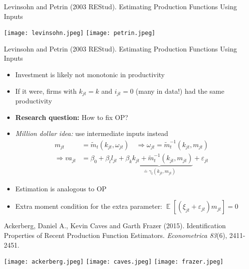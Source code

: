 \documentclass[aspectratio=169,compress,t,xcolor=table]{beamer}
\DeclareMathOperator{\E}{\mathbb{E}}                       %
\begin{document}
\begin{frame}{}
Levinsohn and Petrin (2003 REStud). Estimating Production Functions Using Inputs \\ \phantom{you}
  \begin{center}
    \texttt{[image: levinsohn.jpeg]} \hspace*{1em}
    \texttt{[image: petrin.jpeg]}
  \end{center}
\end{frame}
\addtocounter{framenumber}{-1}

\begin{frame}{}
Levinsohn and Petrin (2003 REStud). Estimating Production Functions Using Inputs
  \begin{itemize}
    \vfill\item Investment is likely not monotonic in productivity
    \vfill\item If it were, firms with \(k_{jt}=k\) and \(i_{jt}=0\) (many in data!) had the same productivity
    \vfill\item {\color{MyStructure}\textbf{Research question:}} How to fix OP?
    \vfill\item {\color{MyStructure}\textit{Million dollar idea:}} use intermediate inputs instead
    \begin{align*}
      m_{jt} &= \tilde{m}_t (k_{jt}, \omega_{jt}) \quad \Rightarrow \omega_{jt} = \tilde{m}^{-1}_t(k_{jt}, m_{jt}) \\[0.5em]
      \Rightarrow va_{jt} &= \beta_0 + \beta_l l_{jt} + \underbrace{\beta_k k_{jt} + \tilde{m}^{-1}_t(k_{jt}, m_{jt})}_{\doteq \gamma_t (k_{jt}, m_{jt})} + \varepsilon_{jt}
    \end{align*}
    \vfill\item Estimation is analogous to OP
    \vfill\item Extra moment condition for the extra parameter: \(\E[(\xi_{jt} + \varepsilon_{jt}) m_{jt}] = 0\)
  \end{itemize}
\end{frame}

\begin{frame}{}
Ackerberg, Daniel A., Kevin Caves and Garth Frazer (2015). Identification Properties of Recent Production Function Estimators. \textit{Econometrica 83}(6), 2411-2451.
  \begin{center}
    \texttt{[image: ackerberg.jpeg]} \hspace*{1em}
    \texttt{[image: caves.jpeg]} \hspace*{1em}
    \texttt{[image: frazer.jpeg]}
  \end{center}
\end{frame}
\addtocounter{framenumber}{-1}
\end{document}
